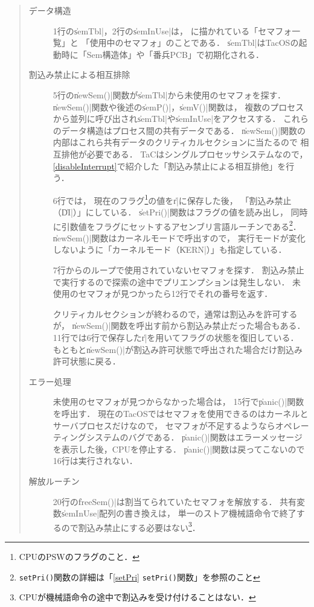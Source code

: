 \begin{quote}
\begin{description}
\item [データ構造]
1行の\|semTbl|，2行の\|semInUse|は，
に描かれている「セマフォ一覧」と
「使用中のセマフォ」のことである．
\|semTbl|はTacOSの起動時に「Sem構造体」や「番兵PCB」で初期化される．

\item [割込み禁止による相互排除]
5行の\|newSem()|関数が\|semTbl|から未使用のセマフォを探す．
\|newSem()|関数や後述の\|semP()|，\|semV()|関数は，
複数のプロセスから並列に呼び出され\|semTbl|や\|semInUse|をアクセスする．
これらのデータ構造はプロセス間の共有データである．
\|newSem()|関数の内部はこれら共有データのクリティカルセクションに当たるので
相互排他が必要である．
TaCはシングルプロセッサシステムなので，
\ref{disableInterrupt}で紹介した「割込み禁止による相互排他」を行う．

6行では，
現在のフラグ\footnote{CPUのPSWのフラグのこと．}の値を\|r|に保存した後，
「割込み禁止（\|DI|）」にしている．
\|setPri()|関数はフラグの値を読み出し，
同時に引数値をフラグにセットするアセンブリ言語ルーチンである\footnote{
{\tt setPri()}関数の詳細は「\ref{setPri} {\tt setPri()}関数」を参照のこと}．
\|newSem()|関数はカーネルモードで呼出すので，
実行モードが変化しないように「カーネルモード（\|KERN|）」も指定している．

7行からのループで使用されていないセマフォを探す．
割込み禁止で実行するので探索の途中でプリエンプションは発生しない．
未使用のセマフォが見つかったら12行でそれの番号を返す．

クリティカルセクションが終わるので，通常は割込みを許可するが，
\|newSem()|関数を呼出す前から割込み禁止だった場合もある．
11行では6行で保存した\|r|を用いてフラグの状態を復旧している．
もともと\|newSem()|が割込み許可状態で呼出された場合だけ割込み許可状態に戻る．

\item [エラー処理]
未使用のセマフォが見つからなかった場合は，
15行で\|panic()|関数を呼出す．
現在のTacOSではセマフォを使用できるのはカーネルとサーバプロセスだけなので，
セマフォが不足するようならオペレーティングシステムのバグである．
\|panic()|関数はエラーメッセージを表示した後，CPUを停止する．
\|panic()|関数は戻ってこないので16行は実行されない．

\item [解放ルーチン]
20行の\|freeSem()|は割当てられていたセマフォを解放する．
共有変数\|semInUse|配列の書き換えは，
単一のストア機械語命令で終了するので割込み禁止にする必要はない\footnote{
CPUが機械語命令の途中で割込みを受け付けることはない．}．
\end{description}
\end{quote}

